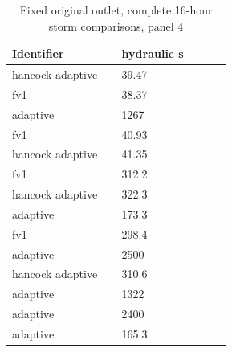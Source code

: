 \begin{longtable}{p{0.4400\linewidth}p{0.4400\linewidth}}
\caption{Fixed original outlet, complete 16-hour storm comparisons, panel 4}\\
\hline
Identifier & hydraulic s \\
\hline\endhead
hancock adaptive & 39.47 \\
fv1 & 38.37 \\
adaptive & 1267 \\
fv1 & 40.93 \\
hancock adaptive & 41.35 \\
fv1 & 312.2 \\
hancock adaptive & 322.3 \\
adaptive & 173.3 \\
fv1 & 298.4 \\
adaptive & 2500 \\
hancock adaptive & 310.6 \\
adaptive & 1322 \\
adaptive & 2400 \\
adaptive & 165.3 \\
\end{longtable}
\endgroup
